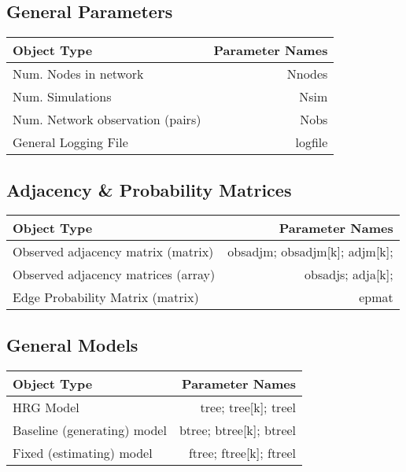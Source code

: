 \documentclass[11pt]{article}
\begin{document}
\subsection{General Parameters}
\begin{tabular}{|l|r|}
\hline
{\bf Object Type} & {\bf Parameter Names} \\


\hline
Num. Nodes in network & Nnodes \\

\hline
Num. Simulations & Nsim \\

\hline
Num. Network observation (pairs) & Nobs \\

\hline 
General Logging File	 & logfile \\

\hline
\end{tabular}



\subsection{Adjacency \& Probability Matrices}
\begin{tabular}{|l|r|}
\hline
{\bf Object Type} & {\bf Parameter Names} \\


\hline
Observed adjacency matrix (matrix) & obsadjm; obsadjm[k]; adjm[k];\\

\hline 
Observed adjacency matrices (array) & obsadjs; adja[k]; \\

\hline
Edge Probability Matrix (matrix) & epmat \\

\hline
\end{tabular}

\subsection{General Models}
\begin{tabular}{|l|r|}
\hline
{\bf Object Type} & {\bf Parameter Names} \\


\hline
HRG Model & tree; tree[k]; treel \\
\hline
Baseline (generating) model & btree; btree[k]; btreel \\
\hline
Fixed (estimating) model & ftree; ftree[k]; ftreel \\

\hline
\end{tabular}
\end{document}

